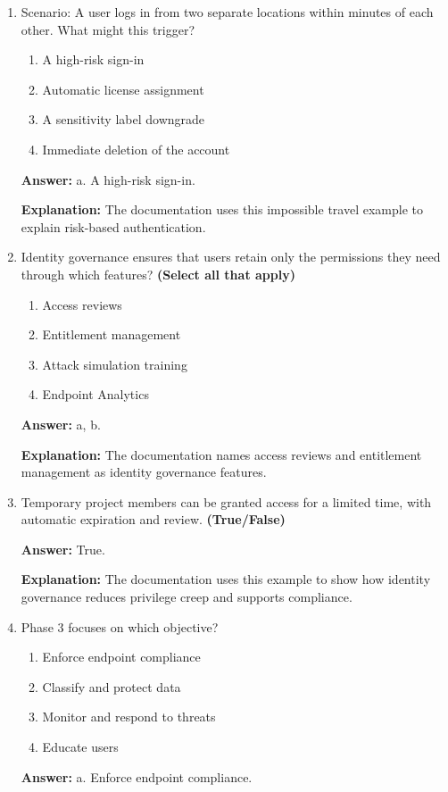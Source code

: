 \documentclass[10pt]{article}
\begin{document}
\begin{enumerate}[leftmargin=*]
\textbf{Explanation:} These are the exact anomalies named in the documentation.

\item Scenario: A user logs in from two separate locations within minutes of each other. What might this trigger?
\begin{enumerate}[label=\alph*., leftmargin=1.5em]
\item A high-risk sign-in
\item Automatic license assignment
\item A sensitivity label downgrade
\item Immediate deletion of the account
\end{enumerate}
\textbf{Answer:} a. A high-risk sign-in.

\textbf{Explanation:} The documentation uses this impossible travel example to explain risk-based authentication.

\item Identity governance ensures that users retain only the permissions they need through which features? \textbf{(Select all that apply)}
\begin{enumerate}[label=\alph*., leftmargin=1.5em]
\item Access reviews
\item Entitlement management
\item Attack simulation training
\item Endpoint Analytics
\end{enumerate}
\textbf{Answer:} a, b.

\textbf{Explanation:} The documentation names access reviews and entitlement management as identity governance features.

\item Temporary project members can be granted access for a limited time, with automatic expiration and review. \textbf{(True/False)}

\textbf{Answer:} True.

\textbf{Explanation:} The documentation uses this example to show how identity governance reduces privilege creep and supports compliance.

\item Phase 3 focuses on which objective?
\begin{enumerate}[label=\alph*., leftmargin=1.5em]
\item Enforce endpoint compliance
\item Classify and protect data
\item Monitor and respond to threats
\item Educate users
\end{enumerate}
\textbf{Answer:} a. Enforce endpoint compliance.


\end{enumerate}
\end{document}
